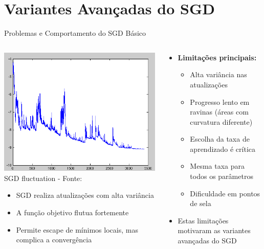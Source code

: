 \documentclass[aspectratio=1610]{beamer}
\begin{document}
\section{Variantes Avançadas do SGD}

\begin{frame}{Problemas e Comportamento do SGD Básico}
\begin{columns}[T]  %
\begin{column}{0.48\textwidth}
\includegraphics[width=\textwidth]{figures/sgd_fluctuation.png}
\scriptsize{SGD fluctuation - Fonte: \cite{ruder2017}}

\begin{itemize}
    \item SGD realiza atualizações com alta variância
    \item A função objetivo flutua fortemente
    \item Permite escape de mínimos locais, mas complica a convergência
\end{itemize}
\end{column}

\begin{column}{0.48\textwidth}
\begin{itemize}
    \item \textbf{Limitações principais:} \pause
    \begin{itemize}
        \item Alta variância nas atualizações \pause
        \item Progresso lento em ravinas (áreas com curvatura diferente) \pause
        \item Escolha da taxa de aprendizado é crítica \pause
        \item Mesma taxa para todos os parâmetros \pause
        \item Dificuldade em pontos de sela
    \end{itemize} \pause
    \item Estas limitações motivaram as variantes avançadas do SGD
\end{itemize}
\end{column}
\end{columns}


\end{frame}
\end{document}
